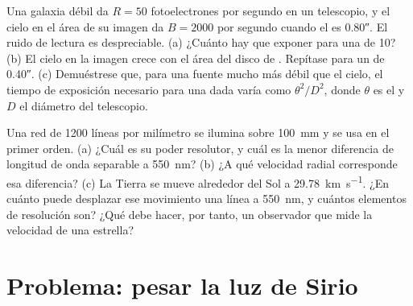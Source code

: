\begin{exercise}[$\star\star\star$]\label{exo:b1:observing-the-sky:11}
Una galaxia débil da $R = 50$ fotoelectrones por segundo en un telescopio, y el cielo en el
área de su imagen da $B = \num{2000}$ por segundo cuando el  es \ang{;;0.80}. El ruido
de lectura es despreciable. (a) ¿Cuánto hay que exponer para una  de 10?
(b) El cielo en la imagen crece con el área del disco de . Repítase para un  de
\ang{;;0.40}. (c) Demuéstrese que, para una fuente mucho más débil que el cielo, el tiempo de
exposición necesario para una  dada varía como $\theta^2/D^2$, donde
$\theta$ es el  y $D$ el diámetro del telescopio.
\end{exercise}

\begin{exercise}[$\star\star\star$]\label{exo:b1:observing-the-sky:12}
Una red de 1200 líneas por milímetro se ilumina sobre \qty{100}{mm} y se usa en el primer
orden. (a) ¿Cuál es su poder resolutor, y cuál es la menor diferencia de longitud de onda
separable a \qty{550}{nm}? (b) ¿A qué velocidad radial corresponde esa diferencia? (c) La
Tierra se mueve alrededor del Sol a \qty{29.78}{km.s^{-1}}. ¿En cuánto puede desplazar ese
movimiento una línea a \qty{550}{nm}, y cuántos elementos de resolución son? ¿Qué debe
hacer, por tanto, un observador que mide la velocidad de una estrella?
\end{exercise}

\section{Problema: pesar la luz de Sirio}


